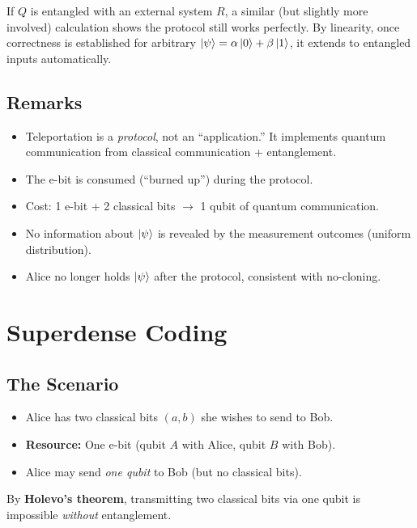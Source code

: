 \documentclass[11pt]{article}
\theoremstyle{definition}
\begin{document}
If $Q$ is entangled with an external system $R$, a similar (but slightly more involved) calculation shows the protocol still works perfectly.  By linearity, once correctness is established for arbitrary $\ket{\psi}=\alpha\ket{0}+\beta\ket{1}$, it extends to entangled inputs automatically.

\subsection{Remarks}

\begin{itemize}
    \item Teleportation is a \emph{protocol}, not an ``application.''  It implements quantum communication from classical communication + entanglement.
    \item The e-bit is consumed (``burned up'') during the protocol.
    \item Cost: 1 e-bit + 2 classical bits $\longrightarrow$ 1 qubit of quantum communication.
    \item No information about $\ket{\psi}$ is revealed by the measurement outcomes (uniform distribution).
    \item Alice no longer holds $\ket{\psi}$ after the protocol, consistent with no-cloning.
\end{itemize}

\section{Superdense Coding}

\subsection{The Scenario}

\begin{itemize}
    \item Alice has two classical bits $(a,b)$ she wishes to send to Bob.
    \item \textbf{Resource:} One e-bit (qubit $A$ with Alice, qubit $B$ with Bob).
    \item Alice may send \emph{one qubit} to Bob (but no classical bits).
\end{itemize}

By \textbf{Holevo's theorem}, transmitting two classical bits via one qubit is impossible \emph{without} entanglement.
\end{document}

